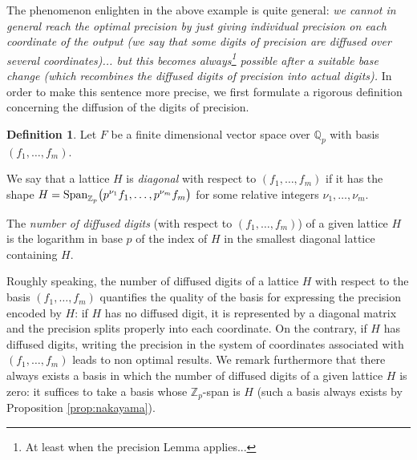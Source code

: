 \documentclass[11pt]{article}
\numberwithin{equation}{section}
\numberwithin{figure}{section}
\theoremstyle{definition}
\newtheorem{deftn}[theo]{Definition}
\newcommand{\Z}{\mathbb Z}
\newcommand{\Zp}{\Z_p}
\newcommand{\Q}{\mathbb Q}
\newcommand{\Qp}{\Q_p}
\newcommand{\Span}{\text{\rm Span}}
\begin{document}
The phenomenon enlighten in the above example is quite general: \emph{we 
cannot in general reach the optimal precision by just giving individual 
precision on each coordinate of the output (we say that some digits of 
precision are diffused over several coordinates)... but this becomes 
always\footnote{At least when the precision Lemma applies...} possible 
after a suitable base change (which recombines the diffused digits of 
precision into actual digits).} In order to make this sentence more
precise, we 
first formulate a rigorous definition concerning the diffusion of the 
digits of precision.

\begin{deftn}
\label{def:diffuseddigits}
Let $F$ be a finite dimensional vector space over $\Qp$ with basis
$(f_1, \ldots, f_m)$.

\smallskip

\noindent
We say that a lattice $H$ is \emph{diagonal} with respect to 
$(f_1, \ldots, f_m)$ if it has the shape
$H = \Span_{\Zp} \big(p^{\nu_1} f_1, \ldots, p^{\nu_m} f_m\big)$ for
some relative integers $\nu_1, \ldots, \nu_m$.

\smallskip

\noindent
The \emph{number of diffused digits} (with respect to $(f_1, \ldots,
f_m)$) of a given lattice $H$ is the 
logarithm in base $p$ of the index of $H$ in the smallest diagonal
lattice containing $H$.
\end{deftn}

Roughly speaking, the number of diffused digits of a lattice $H$ with 
respect to the basis $(f_1, \ldots, f_m)$ quantifies the quality of the 
basis for expressing the precision encoded by $H$: if $H$ has 
no diffused digit, it is represented by a diagonal matrix and the 
precision splits properly into each coordinate. On the contrary, if 
$H$ has diffused digits, writing the precision in the system of 
coordinates associated with $(f_1, \ldots, f_m)$ leads to non optimal 
results.
We remark furthermore that there always exists a basis in which the 
number of diffused digits of a given lattice $H$ is zero: it suffices to 
take a basis whose $\Zp$-span is $H$ (such a basis always exists by 
Proposition \ref{prop:nakayama}).
\end{document}
